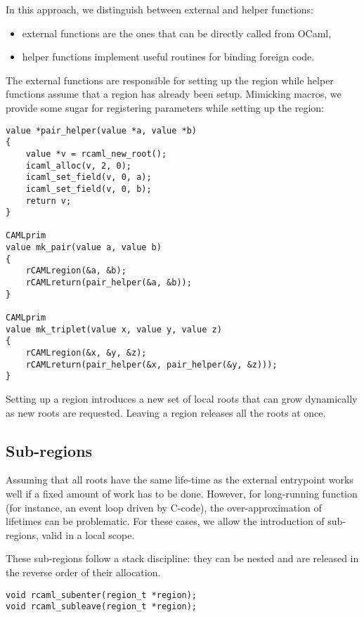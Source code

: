 \documentclass[a4paper]{easychair}
\newcommand{\cpp}[1]{\smash{\lstinline[style=C++]{#1}}}
\begin{document}
In this approach, we distinguish between external and helper functions:

\begin{itemize}
\item external functions are the ones that can be directly called from OCaml,
\item helper functions implement useful routines for binding foreign code.
\end{itemize}

The external functions are responsible for setting up the region while
helper functions assume that a region has already been setup. Mimicking
\cpp{CAMLparam...} macros, we provide some sugar for registering
parameters while setting up the region:

\begin{lstlisting}[style=C++]
value *pair_helper(value *a, value *b)
{
    value *v = rcaml_new_root();
    icaml_alloc(v, 2, 0);
    icaml_set_field(v, 0, a);
    icaml_set_field(v, 0, b);
    return v;
}

CAMLprim
value mk_pair(value a, value b)
{
    rCAMLregion(&a, &b);
    rCAMLreturn(pair_helper(&a, &b));
}

CAMLprim
value mk_triplet(value x, value y, value z)
{
    rCAMLregion(&x, &y, &z);
    rCAMLreturn(pair_helper(&x, pair_helper(&y, &z)));
}
\end{lstlisting}

Setting up a region introduces a new set of local roots that can grow
dynamically as new roots are requested. Leaving a region releases all
the roots at once.

\subsection{Sub-regions}

Assuming that all roots have the same life-time as the external
entrypoint works well if a fixed amount of work has to be done. However,
for long-running function (for instance, an event loop driven by
C-code), the over-approximation of lifetimes can be problematic. For
these cases, we allow the introduction of sub-regions, valid in a local
scope.

These sub-regions follow a stack discipline: they can be nested and are
released in the reverse order of their allocation.

\begin{lstlisting}[style=C++]
void rcaml_subenter(region_t *region);
void rcaml_subleave(region_t *region);
\end{lstlisting}
\end{document}
